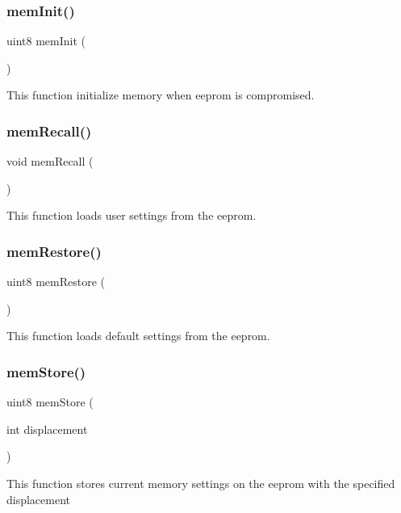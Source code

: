 \subsubsection{mem\+Init()}
{\footnotesize\ttfamily uint8 mem\+Init (\begin{DoxyParamCaption}{ }\end{DoxyParamCaption})}

This function initialize memory when eeprom is compromised. \mbox{\label{command__processing_8c_a3d3b232874d20b4317e9a79cc3c328d9}} 
\subsubsection{mem\+Recall()}
{\footnotesize\ttfamily void mem\+Recall (\begin{DoxyParamCaption}{ }\end{DoxyParamCaption})}

This function loads user settings from the eeprom. \mbox{\label{command__processing_8c_abdb69a74e3147f28d6cbd2b1d406c8a9}} 
\subsubsection{mem\+Restore()}
{\footnotesize\ttfamily uint8 mem\+Restore (\begin{DoxyParamCaption}{ }\end{DoxyParamCaption})}

This function loads default settings from the eeprom. \mbox{\label{command__processing_8c_a81e6b73c0ee52661736a97c08bdb262b}} 
\subsubsection{mem\+Store()}
{\footnotesize\ttfamily uint8 mem\+Store (\begin{DoxyParamCaption}\item[{int}]{displacement }\end{DoxyParamCaption})}

This function stores current memory settings on the eeprom with the specified displacement 